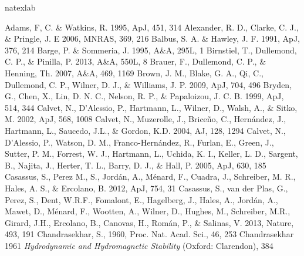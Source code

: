 \documentclass[apj]{emulateapj}
\begin{document}
\begin{thebibliography}{}
\expandafter\ifx\csname natexlab\endcsname\relax\def\natexlab#1{#1}\fi

 Adams, F, C. \& Watkins, R. 1995, ApJ, 451, 314
 Alexander, R. D., Clarke, C. J., \& Pringle, J. E 2006, MNRAS, 369, 216
 Balbus, S. A. \&  Hawley, J. F. 1991, ApJ, 376, 214
 Barge, P. \&  Sommeria, J. 1995, A\&A, 295L, 1
 Birnstiel, T., Dullemond, C. P., \& Pinilla, P. 2013, A\&A, 550L, 8
 Brauer, F., Dullemond, C. P., \& Henning, Th. 2007, A\&A, 469, 1169
 Brown, J. M., Blake, G. A., Qi, C., Dullemond, C. P., Wilner, D. J., \& Williams, J. P. 2009, ApJ, 704, 496
 Bryden, G., Chen, X., Lin, D. N. C., Nelson, R. P., \& Papaloizou, J. C. B. 1999, ApJ, 514, 344
 Calvet, N., D'Alessio, P., Hartmann, L., Wilner, D., Walsh, A., \& Sitko, M. 2002, ApJ, 568, 1008
 Calvet, N., Muzerolle, J., Brice\~no, C.,  Hern\'andez, J., Hartmann, L., Saucedo, J.L., \& Gordon, K.D. 2004, AJ, 128, 1294
 Calvet, N., D'Alessio, P.,
  Watson, D. M., Franco-Hern\'andez, R., Furlan, E., Green, J., Sutter,
  P. M., Forrest, W. J., Hartmann, L., Uchida, K. I., Keller, L. D.,
  Sargent, B., Najita, J., Herter, T. L., Barry, D. J., \& Hall,
  P. 2005, ApJ, 630, 185
 Casassus, S., Perez M., S., Jord\'an, A., M\'enard, F., Cuadra, J., Schreiber, M. R., Hales, 
  A. S., \& Ercolano, B. 2012, ApJ, 754, 31
 Casassus, S., van der Plas, G., Perez, S., Dent, W.R.F., Fomalont, E., Hagelberg, J., Hales,
  A., Jord\'an, A., Mawet, D., M\'enard, F., Wootten, A., Wilner, D., Hughes, M., Schreiber, M.R., Girard, J.H., Ercolano, B., Canovas, H., 
  Rom\'an, P., \& Salinas, V. 2013, Nature, 493, 191
 Chandrasekhar, S., 1960, Proc. Nat. Acad. Sci., 46, 253
 Chandrasekhar 1961 {\it Hydrodynamic and Hydromagnetic Stability} (Oxford: Clarendon), 384

\end{thebibliography}
\end{document}
